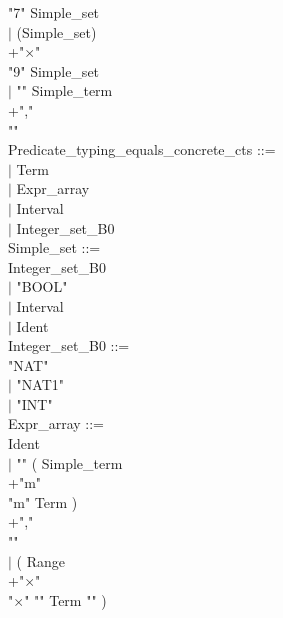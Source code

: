 \documentclass[12pt,a4paper,draft]{report}
\begin{document}
{\begin{sloppypar}
  "7"  Simple\_set  \\ 
\hspace*{0.20in} $|$ (Simple\_set)\\ 
+"$\times$"\\ 
  "9"  Simple\_set  \\ 
\hspace*{0.20in} $|$ "{" Simple\_term\\ 
+","\\ 
 "}"\\ 
Predicate\_typing\_equals\_concrete\_cts ::= \\ 
\hspace*{0.20in} $|$  Term\\ 
\hspace*{0.20in} $|$  Expr\_array \\ 
\hspace*{0.20in} $|$  Interval\\ 
\hspace*{0.20in} $|$   Integer\_set\_B0\\ 
Simple\_set ::= \\ 
\hspace*{0.20in}   Integer\_set\_B0\\ 
\hspace*{0.20in} $|$ "BOOL" \\ 
\hspace*{0.20in} $|$  Interval\\ 
\hspace*{0.20in} $|$ Ident \\ 
Integer\_set\_B0 ::=  \\ 
  "NAT" \\ 
\hspace*{0.20in} $|$ "NAT1" \\ 
\hspace*{0.20in} $|$ "INT" \\ 
Expr\_array ::= \\ 
  Ident \\ 
\hspace*{0.20in} $|$ "{" ( Simple\_term\\ 
+"m"\\ 
 "m" Term )\\ 
+","\\ 
 "}" \\ 
\hspace*{0.20in} $|$ ( Range\\ 
+"$\times$"\\ 
  "$\times$"  "{" Term "}" )\\ 

\end{sloppypar}}
\end{document}
